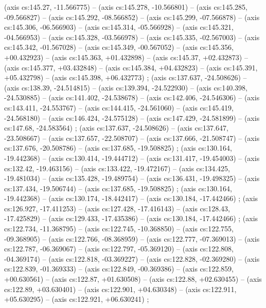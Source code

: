     (axis cs:145.27,    -11.566775) --  (axis cs:145.278,    -10.566801) --  (axis cs:145.285,    -09.566827) --  (axis cs:145.292,    -08.566852) --  (axis cs:145.299,    -07.566878) --  (axis cs:145.306,    -06.566903) --  (axis cs:145.314,    -05.566928) --  (axis cs:145.321,    -04.566953) --  (axis cs:145.328,    -03.566978) --  (axis cs:145.335,    -02.567003) --  (axis cs:145.342,    -01.567028) --  (axis cs:145.349,    -00.567052) --  (axis cs:145.356,    +00.432923) --  (axis cs:145.363,    +01.432898) --  (axis cs:145.37,    +02.432873) --  (axis cs:145.377,    +03.432848) --  (axis cs:145.384,    +04.432823) --  (axis cs:145.391,    +05.432798) --  (axis cs:145.398,    +06.432773) ;
    (axis cs:137.637,    -24.508626) --  (axis cs:138.39,    -24.514815) --  (axis cs:139.394,    -24.522930) --  (axis cs:140.398,    -24.530885) --  (axis cs:141.402,    -24.538678) --  (axis cs:142.406,    -24.546306) --  (axis cs:143.411,    -24.553767) --  (axis cs:144.415,    -24.561060) --  (axis cs:145.419,    -24.568180) --  (axis cs:146.424,    -24.575128) --  (axis cs:147.429,    -24.581899) --  (axis cs:147.68,    -24.583564) ;
    (axis cs:137.637,    -24.508626) --  (axis cs:137.647,    -23.508667) --  (axis cs:137.657,    -22.508707) --  (axis cs:137.666,    -21.508747) --  (axis cs:137.676,    -20.508786) --  (axis cs:137.685,    -19.508825) ;
    (axis cs:130.164,    -19.442368) --  (axis cs:130.414,    -19.444712) --  (axis cs:131.417,    -19.454003) --  (axis cs:132.42,    -19.463156) --  (axis cs:133.422,    -19.472167) --  (axis cs:134.425,    -19.481034) --  (axis cs:135.428,    -19.489754) --  (axis cs:136.431,    -19.498325) --  (axis cs:137.434,    -19.506744) --  (axis cs:137.685,    -19.508825) ;
    (axis cs:130.164,    -19.442368) --  (axis cs:130.174,    -18.442417) --  (axis cs:130.184,    -17.442466) ;
    (axis cs:126.927,    -17.411253) --  (axis cs:127.428,    -17.416143) --  (axis cs:128.43,    -17.425829) --  (axis cs:129.433,    -17.435386) --  (axis cs:130.184,    -17.442466) ;
    (axis cs:122.734,    -11.368795) --  (axis cs:122.745,    -10.368850) --  (axis cs:122.755,    -09.368905) --  (axis cs:122.766,    -08.368959) --  (axis cs:122.777,    -07.369013) --  (axis cs:122.787,    -06.369067) --  (axis cs:122.797,    -05.369120) --  (axis cs:122.808,    -04.369174) --  (axis cs:122.818,    -03.369227) --  (axis cs:122.828,    -02.369280) --  (axis cs:122.839,    -01.369333) --  (axis cs:122.849,    -00.369386) --  (axis cs:122.859,    +00.630561) --  (axis cs:122.87,    +01.630508) --  (axis cs:122.88,    +02.630455) --  (axis cs:122.89,    +03.630401) --  (axis cs:122.901,    +04.630348) --  (axis cs:122.911,    +05.630295) --  (axis cs:122.921,    +06.630241) ;
